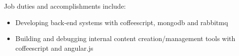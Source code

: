 \normalsize
Job duties and accomplishments include:
\small
\begin{itemize}
    \item Developing back-end systems with coffeescript, mongodb and rabbitmq
    \item Building and debugging internal content creation/management tools with coffeescript and angular.js
\end{itemize}
\normalsize
\medskip
